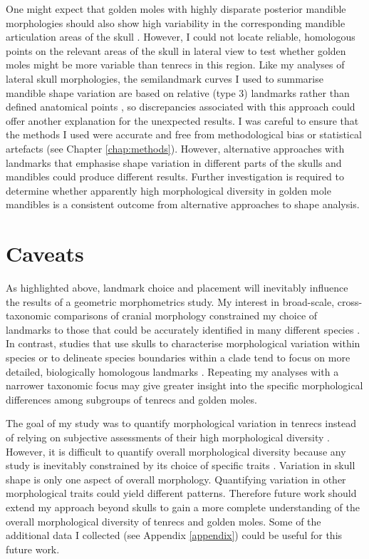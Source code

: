 	One might expect that golden moles with highly disparate posterior mandible morphologies should also show high variability in the corresponding mandible articulation areas of the skull \citep[although developmental genetics studies have revealed that mandibles can also develop shape variation independently of skulls; ][] {Rot-Nikcevic2007}. However, I could not locate reliable, homologous points on the relevant areas of the skull in lateral view to test whether golden moles might be more variable than tenrecs in this region. Like my analyses of lateral skull morphologies, the semilandmark curves I used to summarise mandible shape variation are based on relative (type 3) landmarks rather than defined anatomical points \citep{Zelditch2012}, so discrepancies associated with this approach could offer another explanation for the unexpected results. I was careful to ensure that the methods I used were accurate and free from methodological bias or statistical artefacts (see Chapter \ref{chap:methods}). However, alternative approaches with landmarks that emphasise shape variation in different parts of the skulls and mandibles could produce different results. Further investigation is required to determine whether apparently high morphological diversity in golden mole mandibles is a consistent outcome from alternative approaches to shape analysis. 

		
\section{Caveats}
\label{sect:caveats}

	As highlighted above, landmark choice and placement will inevitably influence the results of a geometric morphometrics study. My interest in broad-scale, cross-taxonomic comparisons of cranial morphology constrained my choice of landmarks to those that could be accurately identified in many different species \citep[e.g.][]{Ruta2013, Goswami2011, Wroe2007}. In contrast, studies that use skulls to characterise morphological variation within species \citep[e.g.][]{Blagojevic2011, Bornholdt2008} or to delineate species boundaries within a clade \citep[e.g.][]{Panchetti2008} tend to focus on more detailed, biologically homologous landmarks \citep{Zelditch2012}. Repeating my analyses with a narrower taxonomic focus may give greater insight into the specific morphological differences among subgroups of tenrecs and golden moles.
	
	The goal of my study was to quantify morphological variation in tenrecs instead of relying on subjective assessments of their high morphological diversity \citep{Olson2013, Soarimalala2011, Eisenberg1969}. However, it is difficult to quantify overall morphological diversity because any study is inevitably constrained by its choice of specific traits \citep{Roy1997}. Variation in skull shape is only one aspect of overall morphology. Quantifying variation in other morphological traits could yield different patterns. Therefore future work should extend my approach beyond skulls to gain a more complete understanding of the overall morphological diversity of tenrecs and golden moles. Some of the additional data I collected (see Appendix \ref{appendix}) could be useful for this future work.
 

